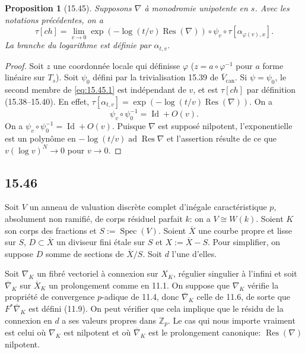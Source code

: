 \documentclass[12pt,a4paper]{article}
\theoremstyle{plain}
\newtheorem{proposition}[theorem]{Proposition}
\theoremstyle{definition}
\theoremstyle{remark}
\DeclareMathOperator{\Spec}{Spec}
\DeclareMathOperator{\Res}{Res}
\DeclareMathOperator{\ad}{ad}
\newcommand{\Id}{\operatorname{Id}}
\newcommand{\bZ}{\mathbb{Z}}
\begin{document}
\begin{proposition}[15.45]
Supposons $\nabla$ à monodromie unipotente en $s$. Avec les notations précédentes, on a
\begin{equation}\label{eq:15.45.1}
\tau[ch] = \lim_{v \to 0} \exp(-\log(t/v) \Res(\nabla)) \circ \psi_v \circ \tau[\alpha_{\varphi(v), x}].
\end{equation}
La branche du logarithme est définie par $\alpha_{t,v}$.
\end{proposition}

\begin{proof}
Soit $z$ une coordonnée locale qui définisse $\varphi$ ($z = a \circ \varphi^{-1}$ pour $a$ forme linéaire sur $T_s$). Soit $\psi_0$ défini par la trivialisation 15.39 de $\overline{V}_{\text{can}}$. Si $\psi = \psi_0$, le second membre de \eqref{eq:15.45.1} est indépendant de $v$, et est $\tau[ch]$ par définition (15.38--15.40). En effet, $\tau[\alpha_{t,v}] = \exp(-\log(t/v) \Res(\nabla))$. On a
\[
\psi_v \circ \psi_0^{-1} = \Id + O(v).
\]
On a $\psi_v \circ \psi_0^{-1} = \Id + O(v)$. Puisque $\nabla$ est supposé nilpotent, l'exponentielle est un polynôme en $-\log(t/v) \ad \Res \nabla$ et l'assertion résulte de ce que $v(\log v)^N \to 0$ pour $v \to 0$.
\end{proof}

\subsection*{15.46}

Soit $V$ un anneau de valuation discrète complet d'inégale caractéristique $p$, absolument non ramifié, de corps résiduel parfait $k$: on a $V \cong W(k)$. Soient $K$ son corps des fractions et $S := \Spec(V)$. Soient $\overline{X}$ une courbe propre et lisse sur $S$, $D \subset \overline{X}$ un diviseur fini étale sur $S$ et $X := \overline{X} - S$. Pour simplifier, on suppose $D$ somme de sections de $\overline{X}/S$. Soit $d$ l'une d'elles.

Soit $\nabla_K$ un fibré vectoriel à connexion sur $X_K$, régulier singulier à l'infini et soit $\overline{\nabla}_K$ sur $\overline{X}_K$ un prolongement comme en 11.1. On suppose que $\nabla_K$ vérifie la propriété de convergence $p$-adique de 11.4, donc $\overline{\nabla}_K$ celle de 11.6, de sorte que $F^* \overline{\nabla}_K$ est défini (11.9). On peut vérifier que cela implique que le résidu de la connexion en $d$ a ses valeurs propres dans $\bZ_p$. Le cas qui nous importe vraiment est celui où $\nabla_K$ est nilpotent et où $\overline{\nabla}_K$ est le prolongement canonique: $\Res(\nabla)$ nilpotent.
\end{document}
